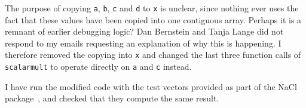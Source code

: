 \documentclass[manuscript]{acmart}
\begin{document}
\begin{itemize}
        The purpose of copying \verb|a|, \verb|b|, \verb|c| and \verb|d| to \verb|x| is unclear, since nothing ever uses the fact that these values have been copied into one contiguous array.
        Perhaps it is a remnant of earlier debugging logic?
        Dan Bernstein and Tanja Lange did not respond to my emails requesting an explanation of why this is happening.
        I therefore removed the copying into \verb|x| and changed the last three function calls of \verb|scalarmult| to operate directly on \verb|a| and \verb|c| instead.
\end{itemize}

I have run the modified code with the test vectors provided as part of the NaCl package~\cite{NaCl}, and checked that they compute the same result.
\end{document}
